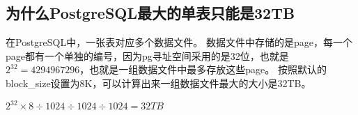 \documentclass[../../../interview-questions.tex]{subfiles}
\begin{document}
\subsection{为什么PostgreSQL最大的单表只能是32TB}

在PostgreSQL中，一张表对应多个数据文件。
数据文件中存储的是page，每一个page都有一个单独的编号，因为pg寻址空间采用的是32位，也就是$2^{32}=4294967296$，也就是一组数据文件中最多存放这些page。
按照默认的block\_size设置为8K，可以计算出来一组数据文件最大的大小是32TB。

$2^{32} \times 8 \div 1024 \div 1024 \div 1024 = 32TB$
\end{document}
